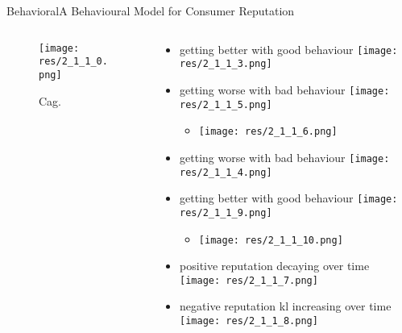 \begin{frame}{Behavioral}{A Behavioural Model for Consumer Reputation \cite{basu_behavioural_2007}}
	
	\begin{columns}
	
		\begin{column}{0.5\textwidth}
				\begin{figure}
					\texttt{[image: res/2\_1\_1\_0.png]}
					\caption{\label{fig:g2}Cag.}
				\end{figure}
		\end{column}
		
		\begin{column}{0.5\textwidth}
			\begin{itemize}
				
				
				\item \small{getting better with good behaviour}
					\texttt{[image: res/2\_1\_1\_3.png]}
					
				\item \small{getting worse with bad behaviour}
					\texttt{[image: res/2\_1\_1\_5.png]}
					\begin{itemize}
						\item \texttt{[image: res/2\_1\_1\_6.png]}
					\end{itemize}
					
					
				\item \small{getting worse with bad behaviour}
					\texttt{[image: res/2\_1\_1\_4.png]}
					
				\item \small{getting better with good behaviour}
					\texttt{[image: res/2\_1\_1\_9.png]}
					\begin{itemize}
						\item \texttt{[image: res/2\_1\_1\_10.png]}
					\end{itemize}
				
				\item \small{positive reputation decaying over time}
					\texttt{[image: res/2\_1\_1\_7.png]}
					
				\item \small{negative reputation kl increasing over time}
					\texttt{[image: res/2\_1\_1\_8.png]}
					
			\end{itemize}
		\end{column}
	\end{columns}
	
	
\end{frame}

